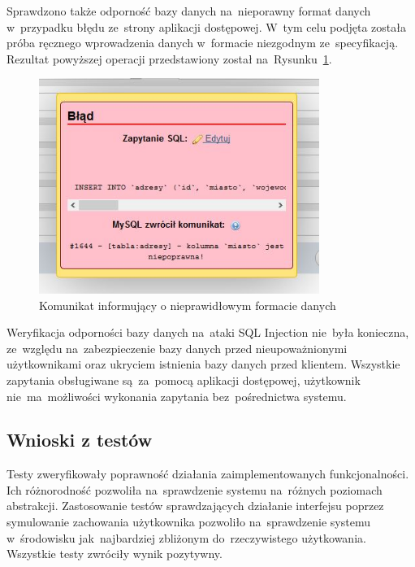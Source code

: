 \documentclass[a4paper, 12pt]{article}
\begin{document}
Sprawdzono także odporność bazy danych na~nieporawny format danych w~przypadku błędu ze~strony aplikacji dostępowej. W~tym celu podjęta została próba ręcznego wprowadzenia danych w~formacie niezgodnym ze~specyfikacją. Rezultat powyższej operacji przedstawiony został na~Rysunku~\ref{fig:testTriggera}.
\begin{figure}[H]
	\centering
	\includegraphics[height=7cm]{Screeny/TriggerDziala.JPG}
	\caption[Rezultat testu triggera]{Komunikat informujący o nieprawidłowym formacie danych}
	\label{fig:testTriggera}
\end{figure}
Weryfikacja odporności bazy danych na~ataki SQL Injection nie~była konieczna, ze~względu na~zabezpieczenie bazy danych przed nieupoważnionymi użytkownikami oraz ukryciem istnienia bazy danych przed klientem. Wszystkie zapytania obsługiwane są~za~pomocą aplikacji dostępowej, użytkownik nie~ma~możliwości wykonania zapytania bez~pośrednictwa systemu.
\subsection{Wnioski z testów}
Testy zweryfikowały poprawność działania zaimplementowanych funkcjonalności. Ich różnorodność pozwoliła na~sprawdzenie systemu na~różnych poziomach abstrakcji. Zastosowanie testów sprawdzających działanie interfejsu poprzez symulowanie zachowania użytkownika pozwoliło na~sprawdzenie systemu w~środowisku jak~najbardziej zbliżonym do~rzeczywistego użytkowania. Wszystkie testy zwróciły wynik pozytywny.
\end{document}
